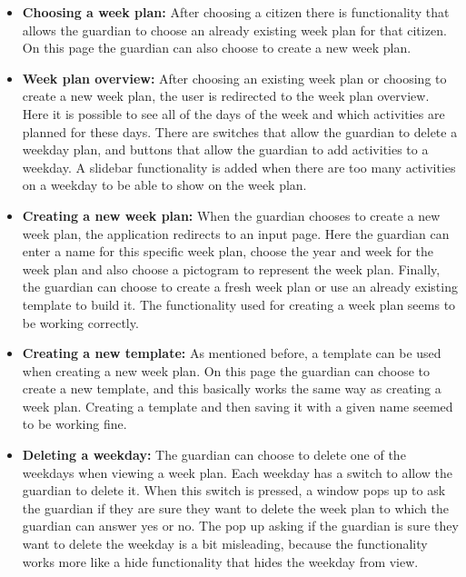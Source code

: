 \begin{itemize}
    \item \textbf{Choosing a week plan:} After choosing a citizen there is functionality that allows the guardian to choose an already existing week plan for that citizen.
    On this page the guardian can also choose to create a new week plan.
    \\
    \item \textbf{Week plan overview:} After choosing an existing week plan or choosing to create a new week plan, the user is redirected to the week plan overview.
    Here it is possible to see all of the days of the week and which activities are planned for these days.
    There are switches that allow the guardian to delete a weekday plan, and buttons that allow the guardian to add activities to a weekday.
    A slidebar functionality is added when there are too many activities on a weekday to be able to show on the week plan.
    \\
    \item \textbf{Creating a new week plan:} When the guardian chooses to create a new week plan, the application redirects to an input page.
    Here the guardian can enter a name for this specific week plan, choose the year and week for the week plan and also choose a pictogram to represent the week plan.
    Finally, the guardian can choose to create a fresh week plan or use an already existing template to build it. The functionality used for creating a week plan seems to be working correctly.
    \\
    \item \textbf{Creating a new template:} As mentioned before, a template can be used when creating a new week plan.
    On this page the guardian can choose to create a new template, and this basically works the same way as creating a week plan.
    Creating a template and then saving it with a given name seemed to be working fine.
    \\
    \item \textbf{Deleting a weekday:} The guardian can choose to delete one of the weekdays when viewing a week plan.
    Each weekday has a switch to allow the guardian to delete it.
    When this switch is pressed, a window pops up to ask the guardian if they are sure they want to delete the week plan to which the guardian can answer yes or no.
    The pop up asking if the guardian is sure they want to delete the weekday is a bit misleading, because the functionality works more like a hide functionality that hides the weekday from view.

\end{itemize}
